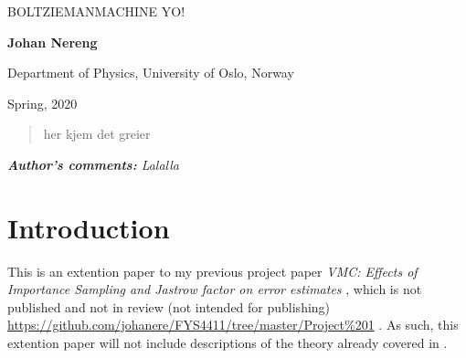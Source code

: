 \documentclass[%
oneside,                 %
final,                   %
10pt]{article}
\begin{document}

\newcommand{\exercisesection}[1]{\subsection*{#1}}






\thispagestyle{empty}

\begin{center}
{\LARGE\bf
\begin{spacing}{1.25}
BOLTZIEMANMACHINE YO!
\end{spacing}
}
\end{center}


\begin{center}
{\bf Johan Nereng}
\end{center}

    \begin{center}
\centerline{{\small Department of Physics, University of Oslo, Norway}}
\end{center}
    

\begin{center}
Spring, 2020
\end{center}

\vspace{3cm}
\vspace{3cm}
\begin{abstract}
her kjem det greier
\end{abstract}


\newpage


\textit{\textbf{Author's comments:} Lalalla}
\newpage


\section{Introduction}
This is an extention paper to my previous project paper \textit{VMC: Effects of Importance Sampling and Jastrow factor on error estimates} \cite{JN_P1}, which is not published and not in review (not intended for publishing) \url{https://github.com/johanere/FYS4411/tree/master/Project\%201} . As such, this extention paper will not include descriptions of the theory already covered in \cite{JN_P1}. 
\end{document}
